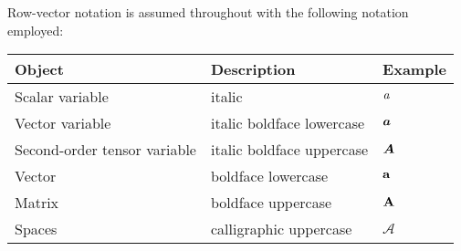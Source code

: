 Row-vector notation is assumed throughout with the following notation employed:

\begin{tabular}{| lll |}
\hline
Object & Description & Example \\
\hline
Scalar variable & italic & $\mathit{{{a}}}$ \\
Vector variable & italic boldface lowercase & $\mathit{\bm{{a}}}$ \\
Second-order tensor variable & italic boldface uppercase & $\mathit{\bm{{A}}}$ \\
Vector & boldface lowercase & $\mathbf{{a}}$ \\
Matrix & boldface uppercase & $\mathbf{{A}}$ \\
Spaces & calligraphic uppercase & $\mathcal{A}$ \\
\hline
\end{tabular}
